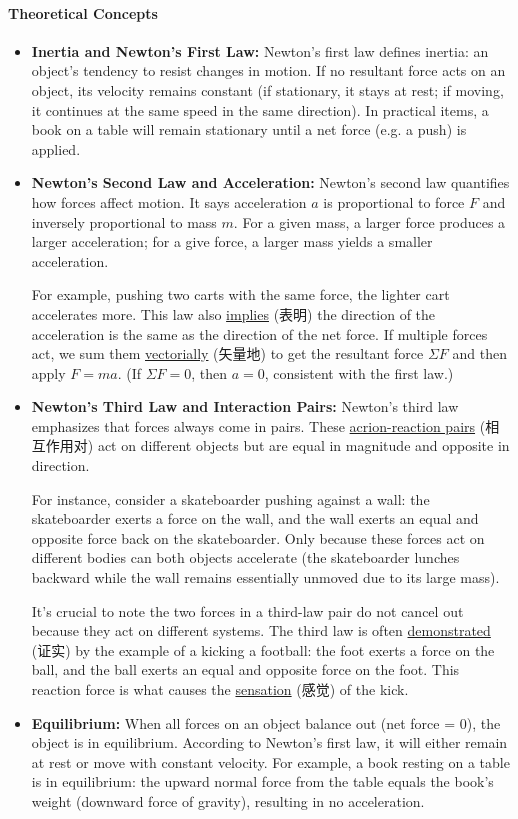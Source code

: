 \paragraph{Theoretical Concepts}
\begin{itemize}
    \item \textbf{Inertia and Newton's First Law:} Newton's first law defines inertia: an object's tendency to resist changes in
    motion. If no resultant force acts on an object, its velocity remains constant (if stationary, it stays at rest; if moving,
    it continues at the same speed in the same direction). In practical items, a book on a table will remain stationary until a
    net force (e.g. a push) is applied.
    \item \textbf{Newton's Second Law and Acceleration:} Newton's second law quantifies how forces affect motion. It says
    acceleration $a$ is proportional to force $F$ and inversely proportional to mass $m$. For a given mass, a larger force
    produces a larger acceleration; for a give force, a larger mass yields a smaller acceleration. \par
    For example, pushing two carts with the same force, the lighter cart accelerates more. This law also \underline{implies}
    (表明) the direction of the acceleration is the same as the direction of the net force. If multiple forces act, we sum them
    \underline{vectorially} (矢量地) to get the resultant force $\Sigma F$ and then apply $F = ma$. (If $\Sigma F = 0$, then
    $a = 0$, consistent with the first law.)
    \item \textbf{Newton's Third Law and Interaction Pairs:} Newton's third law emphasizes that forces always come in pairs.
    These \underline{acrion-reaction pairs} (相互作用对) act on different objects but are equal in magnitude and opposite in
    direction. \par
    For instance, consider a skateboarder pushing against a wall: the skateboarder exerts a force on the wall, and the wall
    exerts an equal and opposite force back on the skateboarder. Only because these forces act on different bodies can both
    objects accelerate (the skateboarder lunches backward while the wall remains essentially unmoved due to its large mass). \par
    It's crucial to note the two forces in a third-law pair do not cancel out because they act on different systems. The third
    law is often \underline{demonstrated} (证实) by the example of a kicking a football: the foot exerts a force on the ball, and
    the ball exerts an equal and opposite force on the foot. This reaction force is what causes the \underline{sensation} (感觉)
    of the kick.
    \item \textbf{Equilibrium:} When all forces on an object balance out (net force = 0), the object is in equilibrium. According
    to Newton's first law, it will either remain at rest or move with constant velocity. For example, a book resting on a table
    is in equilibrium: the upward normal force from the table equals the book's weight (downward force of gravity), resulting in
    no acceleration.
\end{itemize}